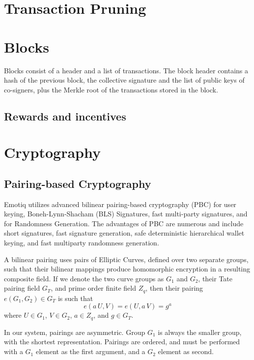\documentclass{yellowpaper}
\begin{document}
\section{Transaction Pruning}




\section{Blocks}
Blocks consist of a header and a list of transactions. The block header contains a hash of the previous block, the collective signature and the list of public keys of co-signers, plus the Merkle root of the transactions stored in the block.

\subsection{Rewards and incentives}

\section{Cryptography}
\subsection{Pairing-based Cryptography}
Emotiq utilizes advanced bilinear pairing-based cryptography\cite{thesis}\cite{lib} (PBC) for user keying, Boneh-Lynn-Shacham (BLS) Signatures\cite{bls}, fast multi-party signatures, and for Randomness Generation. The advantages of PBC are numerous and include short signatures, fast signature generation, safe deterministic hierarchical wallet keying, and fast multiparty randomness generation.

A bilinear pairing uses pairs of Elliptic Curves, defined over two separate groups, such that their bilinear mappings produce homomorphic encryption in a resulting composite field. If we denote the two curve groups as $G_1$ and $G_2$,  their Tate pairing field $G_T$, and prime order finite field $Z_q$, then their pairing $e(G_1,G_2) \in G_T$ is such that $$e(a \, U, V) = e(U, a \, V)= g^a$$ where $U \in G_1$, $V \in G_2$, $a \in Z_q$, and $g \in G_T$.

In our system, pairings are asymmetric. Group $G_1$ is always the smaller group, with the shortest representation. Pairings are ordered, and must be performed with a $G_1$ element as the first argument, and a $G_2$ element as second. 
\end{document}
